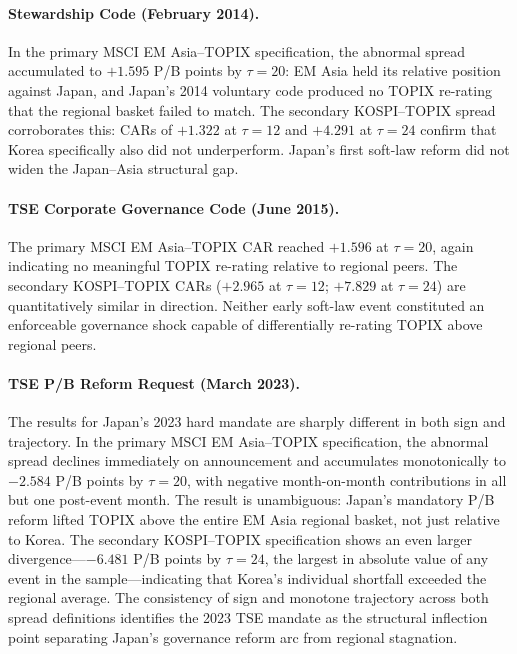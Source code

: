 \paragraph{Stewardship Code (February 2014).} In the primary MSCI EM Asia--TOPIX specification, the abnormal spread accumulated to $+1.595$ P/B points by $\tau = 20$: EM Asia held its relative position against Japan, and Japan's 2014 voluntary code produced no TOPIX re-rating that the regional basket failed to match. The secondary KOSPI--TOPIX spread corroborates this: CARs of $+1.322$ at $\tau = 12$ and $+4.291$ at $\tau = 24$ confirm that Korea specifically also did not underperform. Japan's first soft-law reform did not widen the Japan--Asia structural gap.

\paragraph{TSE Corporate Governance Code (June 2015).} The primary MSCI EM Asia--TOPIX CAR reached $+1.596$ at $\tau = 20$, again indicating no meaningful TOPIX re-rating relative to regional peers. The secondary KOSPI--TOPIX CARs ($+2.965$ at $\tau = 12$; $+7.829$ at $\tau = 24$) are quantitatively similar in direction. Neither early soft-law event constituted an enforceable governance shock capable of differentially re-rating TOPIX above regional peers.

\paragraph{TSE P/B Reform Request (March 2023).} The results for Japan's 2023 hard mandate are sharply different in both sign and trajectory. In the primary MSCI EM Asia--TOPIX specification, the abnormal spread declines immediately on announcement and accumulates monotonically to $-2.584$ P/B points by $\tau = 20$, with negative month-on-month contributions in all but one post-event month. The result is unambiguous: Japan's mandatory P/B reform lifted TOPIX above the entire EM Asia regional basket, not just relative to Korea. The secondary KOSPI--TOPIX specification shows an even larger divergence---$-6.481$ P/B points by $\tau = 24$, the largest in absolute value of any event in the sample---indicating that Korea's individual shortfall exceeded the regional average. The consistency of sign and monotone trajectory across both spread definitions identifies the 2023 TSE mandate as the structural inflection point separating Japan's governance reform arc from regional stagnation.

